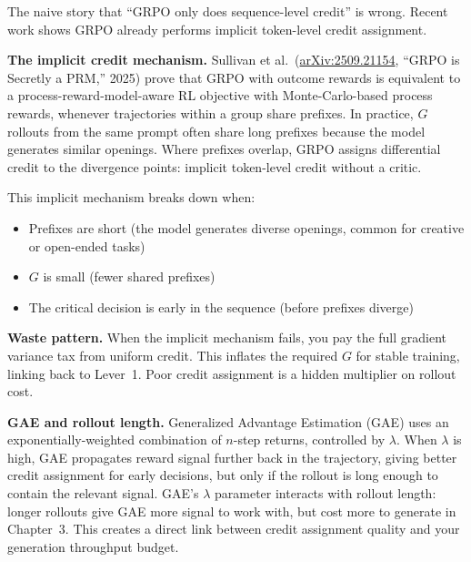 The naive story that ``GRPO only does sequence-level credit'' is wrong. Recent work shows GRPO already performs implicit token-level credit assignment.

\textbf{The implicit credit mechanism.} Sullivan et al.\ (\href{https://arxiv.org/abs/2509.21154}{arXiv:2509.21154}, ``GRPO is Secretly a PRM,'' 2025) prove that GRPO with outcome rewards is equivalent to a process-reward-model-aware RL objective with Monte-Carlo-based process rewards, whenever trajectories within a group share prefixes. In practice, $G$ rollouts from the same prompt often share long prefixes because the model generates similar openings. Where prefixes overlap, GRPO assigns differential credit to the divergence points: implicit token-level credit without a critic.

This implicit mechanism breaks down when:
\begin{itemize}
  \item Prefixes are short (the model generates diverse openings, common for creative or open-ended tasks)
  \item $G$ is small (fewer shared prefixes)
  \item The critical decision is early in the sequence (before prefixes diverge)
\end{itemize}

\textbf{Waste pattern.} When the implicit mechanism fails, you pay the full gradient variance tax from uniform credit. This inflates the required $G$ for stable training, linking back to Lever~1. Poor credit assignment is a hidden multiplier on rollout cost.

\textbf{GAE and rollout length.} Generalized Advantage Estimation (GAE) uses an exponentially-weighted combination of $n$-step returns, controlled by $\lambda$. When $\lambda$ is high, GAE propagates reward signal further back in the trajectory, giving better credit assignment for early decisions, but only if the rollout is long enough to contain the relevant signal. GAE's $\lambda$ parameter interacts with rollout length: longer rollouts give GAE more signal to work with, but cost more to generate in Chapter~3. This creates a direct link between credit assignment quality and your generation throughput budget.

